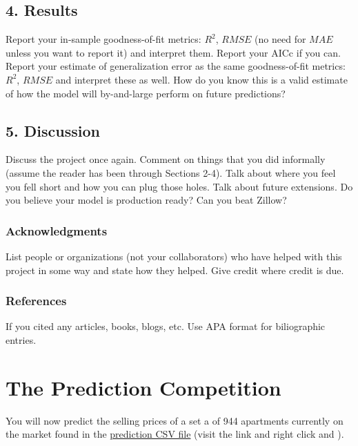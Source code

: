 \documentclass[12pt]{article}
\begin{document}
\begin{tcolorbox}
\subsection*{4. Results}

Report your in-sample goodness-of-fit metrics: $R^2$, $RMSE$ (no need for $MAE$ unless you want to report it) and interpret them. Report your AICc if you can. Report your estimate of generalization error as the same goodness-of-fit metrics: $R^2$, $RMSE$ and interpret these as well. How do you know this is a valid estimate of how the model will by-and-large perform on future predictions?

\subsection*{5. Discussion}

Discuss the project once again. Comment on things that you did informally (assume the reader has been through Sections 2-4). Talk about where you feel you fell short and how you can plug those holes. Talk about future extensions. Do you believe your model is production ready? Can you beat Zillow?


\subsubsection*{Acknowledgments}

List people or organizations (not your collaborators) who have helped with this project in some way and state how they helped. Give credit where credit is due.

\subsubsection*{References}

If you cited any articles, books, blogs, etc. Use APA format for biliographic entries.
\end{tcolorbox}

\section{The Prediction Competition}

 You will now predict the selling prices of a set a of 944 apartments currently on the market found in the \href{https://raw.githubusercontent.com/kapelner/Wharton_Stat_422_722/master/assignments/project/stat_422_722_project_prediction_set.csv}{prediction CSV file} (visit the link and right click and ). 
\end{document}
